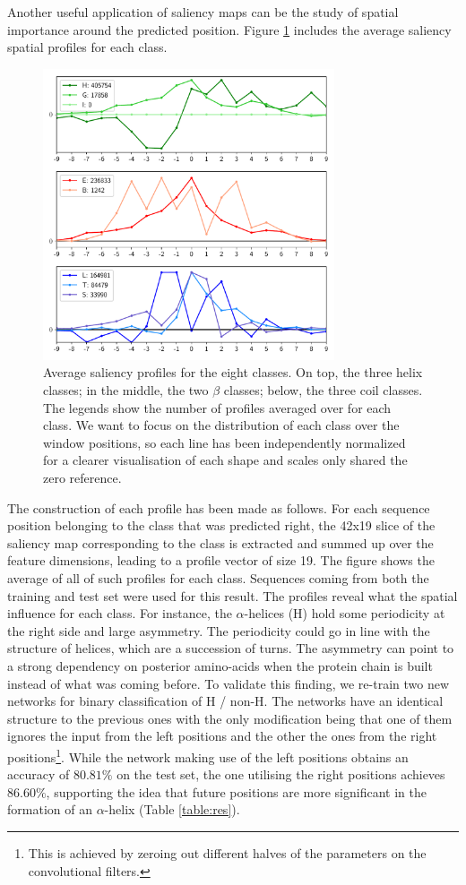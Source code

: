 \documentclass{article}
\begin{document}
Another useful application of saliency maps can be the study of spatial importance around the predicted position. Figure \ref{fig:sheereq} includes the average saliency spatial profiles for each class.
\begin{figure}[t]
	\centering
	\centerline{\includegraphics[width=8.6cm]{sheerabsequal6016_class_aa}}
	\caption{Average saliency profiles for the eight classes. On top, the three helix classes; in the middle, the two $\beta$ classes; below, the three coil classes. The legends show the number of profiles averaged over for each class. We want to focus on the distribution of each class over the window positions, so each line has been independently normalized for a clearer visualisation of each shape and scales only shared the zero reference.}
	\label{fig:sheereq}
\end{figure}
The construction of each profile has been made as follows. For each sequence position belonging to the class that was predicted right, the 42x19 slice of the saliency map corresponding to the class is extracted and summed up over the feature dimensions, leading to a profile vector of size 19. The figure shows the average of all of such profiles for each class. Sequences coming from both the training and test set were used for this result. The profiles reveal what the spatial influence for each class. For instance, the $\alpha$-helices (H) hold some periodicity at the right side and large asymmetry. The periodicity could go in line with the structure of helices, which are a succession of turns. The asymmetry can point to a strong dependency on posterior amino-acids when the protein chain is built instead of what was coming before. To validate this finding, we re-train two new networks for binary classification of H / non-H. The networks have an identical structure to the previous ones with the only modification being that one of them ignores the input from the left positions and the other the ones from the right positions\footnote{This is achieved by zeroing out different halves of the parameters on the convolutional filters.}. While the network making use of the left positions obtains an accuracy of $80.81\%$ on the test set, the one utilising the right positions achieves $86.60\%$, supporting the idea that future positions are more significant in the formation of an $\alpha$-helix (Table \ref{table:res}).
\end{document}

